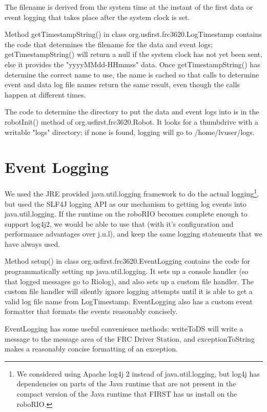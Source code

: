 \documentclass[]{article}
\begin{document}
The filename is derived from the system time at the instant of the first data or event logging that takes place after the system clock is set. 

Method getTimestampString() in class org.usfirst.frc3620.LogTimestamp contains the code that determines the filename for the data and event logs; getTimestampString() will return a null if the system clock has not yet been sent, else it provides the "yyyyMMdd-HHmmss" data.
Once getTimestampString() has determine the correct name to use, the name is cached so that calls to determine event and data log file names return the same result, even though the calls happen at different times.

The code to determine the directory to put the data and event logs into is in the robotInit() method of org.usfirst.frc3620.Robot.
It looks for a thumbdrive with a writable "logs" directory; if none is found, logging will go to /home/lvuser/logs.

\section {Event Logging}

We used the JRE provided java.util.logging framework to do the actual logging\footnote {
We considered using Apache log4j 2 instead of java.util.logging, but log4j has dependencies on parts of the Java runtime that are not present in the compact version of the Java runtime that FIRST has us install on the roboRIO.
}, but used the SLF4J logging API as our mechanism to getting log events into java.util.logging.
If the runtime on the roboRIO becomes complete enough to support log4j2, we would be able to use that (with it's configuration and performance advantages over j.u.l), and keep the same logging statements that we have always used.

Method setup() in class org.usfirst.frc3620.EventLogging contains the code for programmatically setting up java.util.logging.
It sets up a console handler (so that logged messages go to Riolog), and also sets up a custom file handler.
The custom file handler will silently ignore logging attempts until it is able to get a valid log file name from LogTimestamp.
EventLogging also has a custom event formatter that formats the events reasonably concisely.

EventLogging has some useful convenience methods:
writeToDS will write a message to the message area of the FRC Driver Station, and exceptionToString makes a reasonably concise formatting of an exception.
\end{document}
